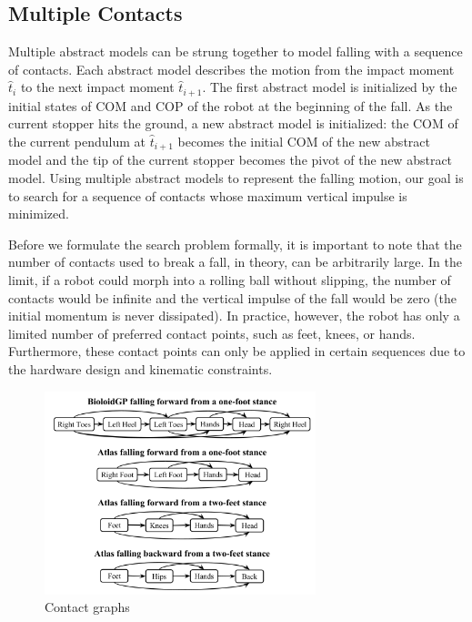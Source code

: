 \subsection{Multiple Contacts}
Multiple abstract models can be strung together to model falling with
a sequence of contacts. Each abstract model describes the motion from
the impact moment $\hat{t}_i$ to the next impact moment
$\hat{t}_{i+1}$. The first abstract model is initialized by the
initial states of COM and COP of the robot at the beginning of the
fall. As the current stopper hits the ground, a new abstract
model is initialized: the COM of the current pendulum at $\hat{t}_{i+1}$ becomes the
initial COM of the new abstract model and the tip of the current
stopper becomes the pivot of the new abstract model. Using multiple
abstract models to represent the falling motion, our goal is to search
for a sequence of contacts whose maximum vertical impulse is
minimized.

Before we formulate the search problem formally, it is important to
note that the number of contacts used to break a fall, in theory, can
be arbitrarily large. In the limit, if a robot could morph into a
rolling ball without slipping, the number of contacts would be infinite and
the vertical impulse of the fall would be zero (the initial momentum is never
dissipated). In practice, however, the robot has only a limited number
of preferred contact points, such as feet, knees, or
hands. Furthermore, these contact points can only be applied in
certain sequences due to the hardware design and kinematic
constraints. 

\begin{figure}[h]
\center
  \includegraphics[width=3.1in]{images/all_contact_graphs.png}
  \caption{Contact graphs}
  \label{fig:falling_contact_graph}
\end{figure}

